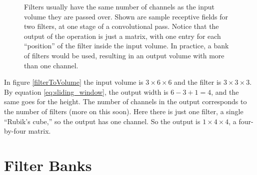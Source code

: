 \begin{figure}
\centering
{}
\caption[Soraya Boza and Jeff Yoshimi.]{Filters usually have the same number of channels as the input volume they are passed over. Shown are sample receptive fields for two filters, at one stage of a convolutional pass. Notice that the output of the operation is just a matrix, with one entry for each ``position'' of the filter inside the input volume. In practice, a bank of filters would be used, resulting in an output volume with more than one channel.}
\label{filterChannels}
\end{figure}

In figure \ref{filterToVolume} the input volume is $3 \times 6 \times 6$ and the filter is $3 \times 3 \times 3$. By equation \ref{eq:sliding_window}, the output width is $6 - 3 + 1 = 4$, and the same goes for the height. The number of channels in the output corresponds to the number of filters (more on this soon). Here there is just one filter, a single ``Rubik's cube,'' so the output has one channel. So the output is $1 \times 4 \times 4$, a four-by-four matrix.

\section{Filter Banks}\label{sect_filterBank}


